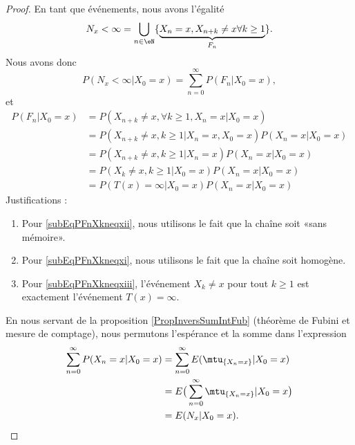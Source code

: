 \begin{proof}
    En tant que événements, nous avons l'égalité
    \begin{equation}
        N_x<\infty=\bigcup_{n\in\eN}\{\underbrace{ X_n=x,X_{n+k}\neq x\forall k\geq 1}_{F_n} \}.
    \end{equation}
    Nous avons donc 
    \begin{equation}    \label{Eqreprencalculstd}
        P(N_x<\infty|X_0=x)=\sum_{n=0}^{\infty}P(F_n|X_0=x),
    \end{equation}
    et
    \begin{subequations}
        \begin{align}
            P(F_n|X_0=x)&=P(X_{n+k}\neq x, \forall k\geq 1,X_n=x|X_0=x)\\
            &=P(X_{n+k}\neq x,k\geq 1|X_n=x,X_0=x)P(X_n=x|X_0=x)\\
            &=P(X_{n+k}\neq x,k\geq 1|X_n=x)P(X_n=x|X_0=x)  \label{subEqPFnXkneqxii}\\
            &=P(X_k\neq x,k\geq 1|X_0=x)P(X_n=x|X_0=x)  \label{subEqPFnXkneqxi}\\
            &=P(T(x)=\infty|X_0=x)P(X_n=x|X_0=x)    \label{subEqPFnXkneqxiii}
        \end{align}
    \end{subequations}
    Justifications :
    \begin{enumerate}
        \item
            Pour \eqref{subEqPFnXkneqxii}, nous utilisons le fait que la chaîne soit «sans mémoire».
        \item
            Pour \eqref{subEqPFnXkneqxi}, nous utilisons le fait que la chaîne soit homogène.
        \item
            Pour \eqref{subEqPFnXkneqxiii}, l'événement \( X_k\neq x\) pour tout \( k\geq 1\) est exactement l'événement \( T(x)=\infty\).
    \end{enumerate}
    En nous servant de la proposition \ref{PropInversSumIntFub} (théorème de Fubini et mesure de comptage), nous permutons l'espérance et la somme dans l'expression
    \begin{subequations}        \label{EqPEEEntstq}
        \begin{align}
            \sum_{n=0}^{\infty}P(X_n=x|X_0=x)&=\sum_{n=0}^{\infty}E(\mtu_{\{ X_n=x \}}|X_0=x)\\
            &=E\big( \sum_{n=0}^{\infty}\mtu_{\{ X_n=x \}}|X_0=x \big)\\
            &=E(N_x|X_0=x).
        \end{align}

\end{subequations}
\end{proof}
